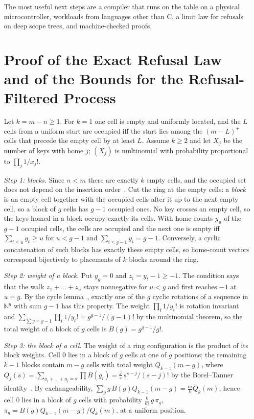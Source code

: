 The most useful next steps are a compiler that runs on the table on a physical microcontroller, workloads from languages other than C, a limit law for refusals on deep scope trees, and machine-checked proofs.

\appendices
\section{Proof of the Exact Refusal Law and of the Bounds for the Refusal-Filtered Process}
\label{app:proof}
Let $k=m-n\ge1$. For $k=1$ one cell is empty and uniformly located, and the $L$ cells from a uniform start are occupied iff the start lies among the $(m-L)^{+}$ cells that precede the empty cell by at least $L$. Assume $k\ge2$ and let $X_j$ be the number of keys with home $j$; $(X_j)$ is multinomial with probability proportional to $\prod_j 1/x_j!$.

\emph{Step 1: blocks.} Since $n<m$ there are exactly $k$ empty cells, and the occupied set does not depend on the insertion order~\cite{konheim1966}. Cut the ring at the empty cells: a \emph{block} is an empty cell together with the occupied cells after it up to the next empty cell, so a block of $g$ cells has $g-1$ occupied ones. No key crosses an empty cell, so the keys homed in a block occupy exactly its cells. With home counts $y_u$ of the $g-1$ occupied cells, the cells are occupied and the next one is empty iff $\sum_{t\le u}y_t\ge u$ for $u<g-1$ and $\sum_{t\le g-1}y_t=g-1$. Conversely, a cyclic concatenation of such blocks has exactly these empty cells, so home-count vectors correspond bijectively to placements of $k$ blocks around the ring.

\emph{Step 2: weight of a block.} Put $y_g=0$ and $z_t=y_t-1\ge-1$. The condition says that the walk $z_1+\dots+z_u$ stays nonnegative for $u<g$ and first reaches $-1$ at $u=g$. By the cycle lemma~\cite{dwass1969}, exactly one of the $g$ cyclic rotations of a sequence in $\mathbb N^{g}$ with sum $g-1$ has this property. The weight $\prod_t 1/y_t!$ is rotation invariant and $\sum_{\sum y=g-1}\prod_t 1/y_t!=g^{g-1}/(g-1)!$ by the multinomial theorem, so the total weight of a block of $g$ cells is $B(g)=g^{g-1}/g!$.

\emph{Step 3: the block of a cell.} The weight of a ring configuration is the product of its block weights. Cell $0$ lies in a block of $g$ cells at one of $g$ positions; the remaining $k-1$ blocks contain $m-g$ cells with total weight $Q_{k-1}(m-g)$, where $Q_j(s)=\sum_{g_1+\dots+g_j=s}\prod B(g_i)=\tfrac{j}{s}\,s^{s-j}/(s-j)!$ by the Borel--Tanner identity~\cite{tanner1961}. By exchangeability, $\sum_g g\,B(g)Q_{k-1}(m-g)=\tfrac mk Q_k(m)$, hence cell $0$ lies in a block of $g$ cells with probability $\tfrac km\,g\,\pi_g$, $\pi_g=B(g)Q_{k-1}(m-g)/Q_k(m)$, at a uniform position.


